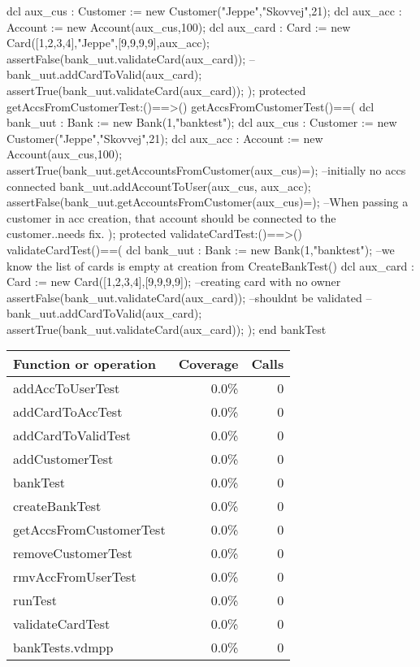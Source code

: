 \documentclass[a4paper]{article}
\begin{document}
\begin{vdm_al}
        dcl aux_cus : Customer := new Customer("Jeppe","Skovvej",21);
        dcl aux_acc : Account := new Account(aux_cus,100);
        dcl aux_card : Card := new Card([1,2,3,4],"Jeppe",[9,9,9,9],aux_acc);
        assertFalse(bank_uut.validateCard(aux_card));
        --
        bank_uut.addCardToValid(aux_card);
        assertTrue(bank_uut.validateCard(aux_card));
    );
    protected getAccsFromCustomerTest:()==>()
    getAccsFromCustomerTest()==(
        dcl bank_uut : Bank := new Bank(1,"banktest");
        dcl aux_cus : Customer := new Customer("Jeppe","Skovvej",21);
        dcl aux_acc : Account := new Account(aux_cus,100);
        assertTrue(bank_uut.getAccountsFromCustomer(aux_cus)={}); --initially no accs connected
        bank_uut.addAccountToUser(aux_cus, aux_acc);
        assertFalse(bank_uut.getAccountsFromCustomer(aux_cus)={});
        --When passing a customer in acc creation, that account should be connected to the customer..needs fix.
    );
    protected validateCardTest:()==>()
    validateCardTest()==(
        dcl bank_uut : Bank := new Bank(1,"banktest");
        --we know the list of cards is empty at creation from CreateBankTest()
        dcl aux_card : Card := new Card([1,2,3,4],[9,9,9,9]); --creating card with no owner
        assertFalse(bank_uut.validateCard(aux_card)); --shouldnt be validated
        --
        bank_uut.addCardToValid(aux_card);
        assertTrue(bank_uut.validateCard(aux_card));
    ); 
end bankTest
\end{vdm_al}
\bigskip
\begin{longtable}{|l|r|r|}
\hline
Function or operation & Coverage & Calls \\
\hline
\hline
addAccToUserTest & 0.0\% & 0 \\
\hline
addCardToAccTest & 0.0\% & 0 \\
\hline
addCardToValidTest & 0.0\% & 0 \\
\hline
addCustomerTest & 0.0\% & 0 \\
\hline
bankTest & 0.0\% & 0 \\
\hline
createBankTest & 0.0\% & 0 \\
\hline
getAccsFromCustomerTest & 0.0\% & 0 \\
\hline
removeCustomerTest & 0.0\% & 0 \\
\hline
rmvAccFromUserTest & 0.0\% & 0 \\
\hline
runTest & 0.0\% & 0 \\
\hline
validateCardTest & 0.0\% & 0 \\
\hline
\hline
bankTests.vdmpp & 0.0\% & 0 \\
\hline
\end{longtable}
\end{document}

